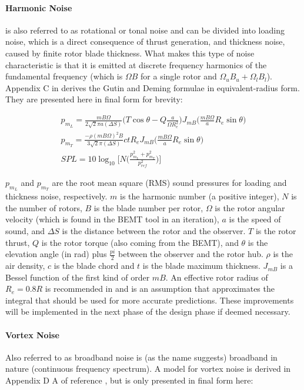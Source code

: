 \paragraph{Harmonic Noise} is also referred to as rotational or tonal noise and can be divided into loading noise, which is a direct consequence of thrust generation, and thickness noise, caused by finite rotor blade thickness. What makes this type of noise characteristic is that it is emitted at discrete frequency harmonics of the fundamental frequency (which is $\Omega B$ for a single rotor and $\Omega_u B_u+ \Omega_l B_l$). Appendix C in \cite{Brown2018} derives the Gutin and Deming formulae in equivalent-radius form. They are presented here in final form for brevity:

\begin{align}
    p_{m_L} = \frac{mB\Omega}{2\sqrt{2}\pi a (\Delta S)} \Big(T \cos \theta - Q \frac{a}{\Omega R_e^2} \Big) J_{mB}\Big(\frac{m B \Omega}{a} R_e \sin \theta \Big) \\
    p_{m_T} = \frac{-\rho (m B \Omega)^2 B}{3 \sqrt{2} \pi (\Delta S)} c t R_e J_{mB} \Big(\frac{m B \Omega}{a} R_e \sin \theta \Big) \\
    SPL = 10 \log_10 \bigg[N \bigg(\frac{p_{m_L}^2+p_{m_T}^2}{p_{ref}^2} \bigg) \bigg]
\end{align}

$p_{m_L}$ and $p_{m_T}$ are the root mean square (RMS) sound pressures for loading and thickness noise, respectively. $m$ is the harmonic number (a positive integer), $N$ is the number of rotors, $B$ is the blade number per rotor, $\Omega$ is the rotor angular velocity (which is found in the BEMT tool in an iteration), $a$ is the speed of sound, and $\Delta S$ is the distance between the rotor and the observer. $T$ is the rotor thrust, $Q$ is the rotor torque (also coming from the BEMT), and $\theta$ is the elevation angle (in rad) plus $\frac{pi}{2}$ between the observer and the rotor hub. $\rho$ is the air density, $c$ is the blade chord and $t$ is the blade maximum thickness. $J_{mB}$ is a Bessel function of the first kind of order $mB$. An effective rotor radius of $R_e = 0.8 R$ is recommended in \cite{Brown2018} and is an assumption that approximates the integral that should be used for more accurate predictions. These improvements will be implemented in the next phase of the design phase if deemed necessary.


\paragraph{Vortex Noise} Also referred to as broadband noise is (as the name suggests) broadband in nature (continuous frequency spectrum). A model for vortex noise is derived in Appendix D A of reference \cite{Brown2018}, but is only presented in final form here:

